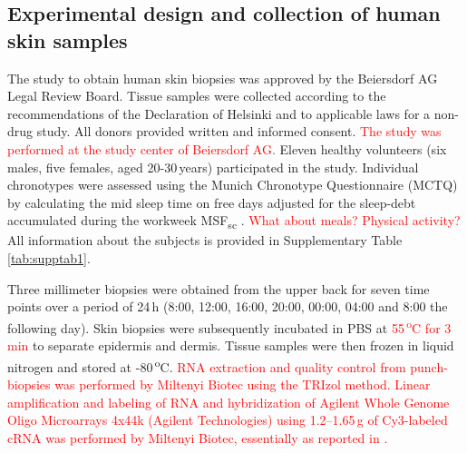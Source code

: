 \subsection*{Experimental design and collection of human skin samples}
The study to obtain human skin biopsies was approved by the Beiersdorf AG Legal Review Board. Tissue samples were collected according to the recommendations of the Declaration of Helsinki and to applicable laws for a non-drug study. All donors provided written and informed consent. \textcolor{red}{The study was performed at the study center of Beiersdorf AG.} Eleven healthy volunteers (six males, five females, aged 20-30\,years) participated in the study. Individual chronotypes were assessed using the Munich Chronotype Questionnaire (MCTQ) by calculating the mid sleep time on free days adjusted for the sleep-debt accumulated during the workweek MSF\textsubscript{sc} \cite{Vetter2021}. \textcolor{red}{What about meals? Physical activity?} All information about the subjects is provided in Supplementary Table \ref{tab:supptab1}.   %

Three millimeter biopsies were obtained from the upper back for seven time points over a period of 24\,h (8:00, 12:00, 16:00, 20:00, 00:00, 04:00 and 8:00 the following day). Skin biopsies were subsequently incubated in PBS at \textcolor{red}{55\,\textsuperscript{o}C for 3\,min} to separate epidermis and dermis. Tissue samples were then frozen in liquid nitrogen and stored at -80\,\textsuperscript{o}C. \textcolor{red}{RNA extraction and quality control from punch-biopsies was performed by Miltenyi Biotec using the TRIzol method. Linear amplification and labeling of RNA and hybridization of Agilent Whole Genome Oligo Microarrays 4x44k (Agilent Technologies) using 1.2--1.65\,\textmu g of Cy3-labeled cRNA was performed by Miltenyi Biotec, essentially as reported in \cite{Duggan1999}.}  

